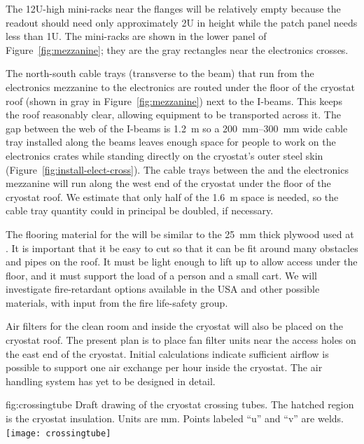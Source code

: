 The 12U-high mini-racks near the \fdth flanges will be relatively empty because the  readout should need only approximately 2U in height while the  patch panel needs less than 1U. The mini-racks are shown in the lower panel of Figure~\ref{fig:mezzanine}; 
they are the gray rectangles near the electronics crosses.

The north-south cable trays (transverse to the beam) that run from the electronics mezzanine to the electronics \fdth are routed under the floor of the cryostat roof (shown in gray in Figure~\ref{fig:mezzanine}) next to the 
I-beams. 
This keeps the roof reasonably clear, allowing equipment to be transported across it. 
The gap between the web of the I-beams is \SI{1.2}{m} so 
a \SIrange{200}{300}{mm} wide cable tray installed along the beams 
leaves enough space for people to work on the electronics crates while standing directly on the cryostat's outer steel skin (Figure~\ref{fig:install-elect-cross}). 
The cable trays between the  and the electronics mezzanine will run along the west end of the cryostat under the floor of the cryostat roof. 
We estimate that only half of the \SI{1.6}{m} space is needed, so the cable tray quantity could in principal be doubled, if necessary. 

The flooring material for the 
will be similar to the \SI{25}{mm} thick plywood used at . 
It is important that it be easy to cut so that it can be fit around many obstacles and pipes on the roof.  
It must be light enough to lift up to allow access under the floor, and it must support the load of a person and a small cart. 
We will investigate fire-retardant options available in the USA and other possible materials, with input from the  fire life-safety group. 

Air filters for the clean room and inside the cryostat will also be placed on the cryostat roof. The present plan is to place fan filter units near the %
access holes on the east end of the cryostat. Initial calculations indicate sufficient airflow is possible to support one air exchange per hour inside the cryostat. The air handling system has yet to be designed in detail.


\begin{dunefigure}{fig:crossingtube}
  {Draft drawing of the cryostat crossing tubes. The hatched region is the cryostat insulation. Units are mm. Points labeled ``u'' and ``v'' are welds. }
\texttt{[image: crossingtube]}
\end{dunefigure}
 
